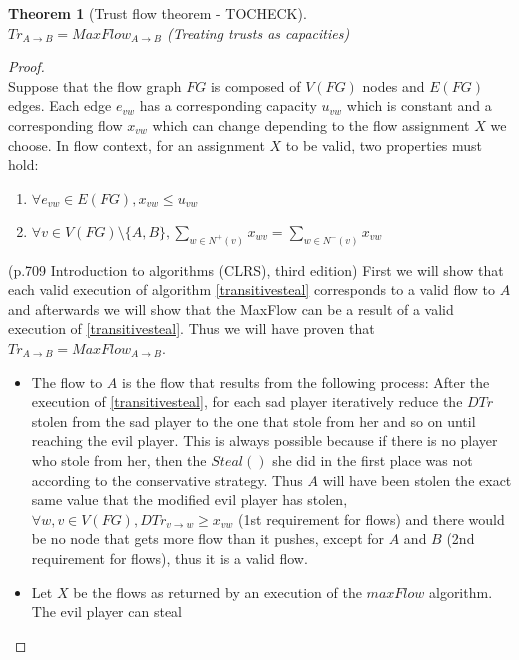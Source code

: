 \documentclass[11pt]{article}
\newtheorem{theorem}{Theorem}[section]
\theoremstyle{definition}
\theoremstyle{corollary}
\theoremstyle{lemma}
\begin{document}
    \begin{theorem}[Trust flow theorem - TOCHECK] \ \\
    \label{trustflow}
       $Tr_{A \rightarrow B} = MaxFlow_{A \rightarrow B}$ (Treating trusts as capacities)
    \end{theorem}
    \begin{proof} \ \\
       Suppose that the flow graph $FG$ is composed of $V(FG)$ nodes and $E(FG)$ edges. Each edge $e_{vw}$ has a
       corresponding capacity $u_{vw}$ which is constant and a corresponding flow $x_{vw}$ which can change depending to the
       flow assignment $X$ we choose. In flow context, for an assignment $X$ to be valid, two properties must hold:
       \begin{enumerate}
          \item $\forall e_{vw} \in E(FG), x_{vw} \leq u_{vw}$
          \item $\forall v \in V(FG) \setminus \{A,B\}, \sum\limits_{w \in N^{+}(v)}x_{wv} =
                \sum\limits_{w \in N^{-}(v)}x_{vw}$
       \end{enumerate} (p.709 Introduction to algorithms (CLRS), third edition)
       First we will show that each valid execution of algorithm \ref{transitivesteal} corresponds to a valid flow to $A$ and
       afterwards we will show that the MaxFlow can be a result of a valid execution of \ref{transitivesteal}. Thus we will
       have proven that $Tr_{A \rightarrow B} = MaxFlow_{A \rightarrow B}$.
       \begin{itemize}
          \item The flow to $A$ is the flow that results from the following process: After the execution of
          \ref{transitivesteal}, for each sad player iteratively reduce the $DTr$ stolen from the sad player to the one that
          stole from her and so on until reaching the evil player. This is always possible because if there is no player who
          stole from her, then the $Steal()$ she did in the first place was not according to the conservative strategy.
          Thus $A$ will have been stolen the exact same value that the modified evil player has stolen, $\forall w,v \in
          V(FG), DTr_{v \rightarrow w} \geq x_{vw}$ (1st requirement for flows) and there would be no node that gets more
          flow than it pushes, except for $A$ and $B$ (2nd requirement for flows), thus it is a valid flow.
          \item Let $X$ be the flows as returned by an execution of the $maxFlow$ algorithm. The evil player can steal

\end{itemize}
\end{proof}
\end{document}
